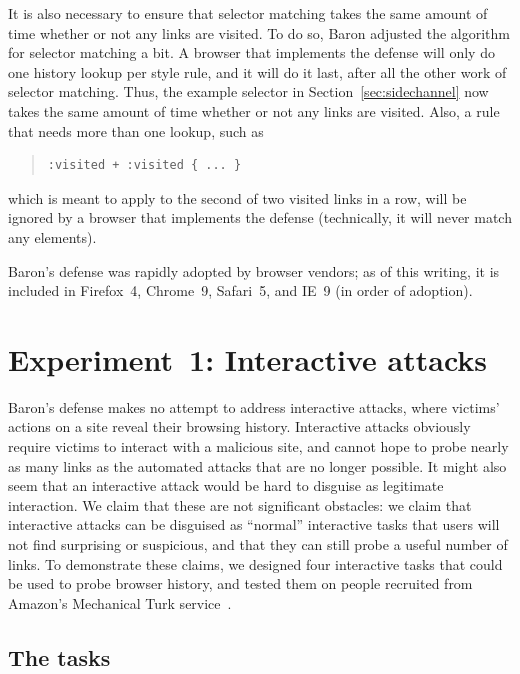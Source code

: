 \documentclass[conference]{IEEEtran}
\begin{document}
It is also necessary to ensure that selector matching takes the same
amount of time whether or not any links are visited.  To do so, Baron
adjusted the algorithm for selector matching a bit.  A browser that
implements the defense will only do one history lookup per style rule,
and it will do it last, after all the other work of selector matching.
Thus, the example selector in Section~\ref{sec:sidechannel} now takes the
same amount of time whether or not any links are visited.  Also, a
rule that needs more than one lookup, such as
\begin{quote}\footnotesize
\begin{verbatim}
:visited + :visited { ... }
\end{verbatim}
\end{quote}
which is meant to apply to the second of two visited links in a
row, will be ignored by a browser that implements the defense
(technically, it will never match any elements).

Baron's defense was rapidly adopted by browser vendors; as of this
writing, it is included in Firefox~4, Chrome~9, Safari~5, and IE~9 (in
order of adoption).

\section{Experiment~1: Interactive attacks}\label{sec:interactexpt}

Baron's defense makes no attempt to address interactive attacks, where
victims' actions on a site reveal their browsing history.  Interactive
attacks obviously require victims to interact with a malicious site,
and cannot hope to probe nearly as many links as the automated attacks
that are no longer possible.  It might also seem that an interactive
attack would be hard to disguise as legitimate interaction.  We claim
that these are not significant obstacles: we claim that interactive
attacks can be disguised as “normal” interactive tasks that users will
not find surprising or suspicious, and that they can still probe a
useful number of links.  To demonstrate these claims, we designed four
interactive tasks that could be used to probe browser history, and
tested them on people recruited from Amazon's Mechanical Turk
service~\cite{mturk_service}.

\subsection{The tasks}
\end{document}
